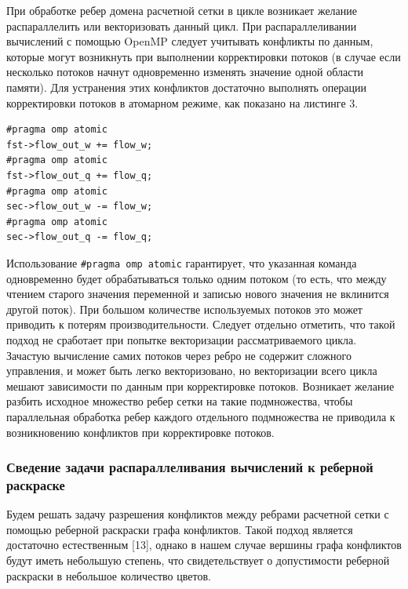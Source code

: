 При обработке ребер домена расчетной сетки в цикле возникает желание распараллелить или векторизовать данный цикл.
При распараллеливании вычислений с помощью OpenMP следует учитывать конфликты по данным, которые могут возникнуть при выполнении корректировки потоков (в случае если несколько потоков начнут одновременно изменять значение одной области памяти).
Для устранения этих конфликтов достаточно выполнять операции корректировки потоков в атомарном режиме, как показано на листинге 3.

\begin{lstlisting}[caption={caption}, label={label}]
#pragma omp atomic
fst->flow_out_w += flow_w;
#pragma omp atomic
fst->flow_out_q += flow_q;
#pragma omp atomic
sec->flow_out_w -= flow_w;
#pragma omp atomic
sec->flow_out_q -= flow_q;
\end{lstlisting}

Использование \texttt{\#pragma omp atomic} гарантирует, что указанная команда одновременно будет обрабатываться только одним потоком (то есть, что между чтением старого значения переменной и записью нового значения не вклинится другой поток).
При большом количестве используемых потоков это может приводить к потерям производительности. Следует отдельно отметить, что такой подход не сработает при попытке векторизации рассматриваемого цикла.
Зачастую вычисление самих потоков через ребро не содержит сложного управления, и может быть легко векторизовано, но векторизации всего цикла мешают зависимости по данным при корректировке потоков.
Возникает желание разбить исходное множество ребер сетки на такие подмножества, чтобы параллельная обработка ребер каждого отдельного подмножества не приводила к возникновению конфликтов при корректировке потоков.

\subsubsection{Сведение задачи распараллеливания вычислений к реберной раскраске}

Будем решать задачу разрешения конфликтов между ребрами расчетной сетки с помощью реберной раскраски графа конфликтов.
Такой подход является достаточно естественным [13], однако в нашем случае вершины графа конфликтов будут иметь небольшую степень, что свидетельствует о допустимости реберной раскраски в небольшое количество цветов.


